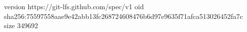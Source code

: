 version https://git-lfs.github.com/spec/v1
oid sha256:75597558aae9e42abb13fc268724608476b6d97e9635f71afca513026452fa7c
size 349692

